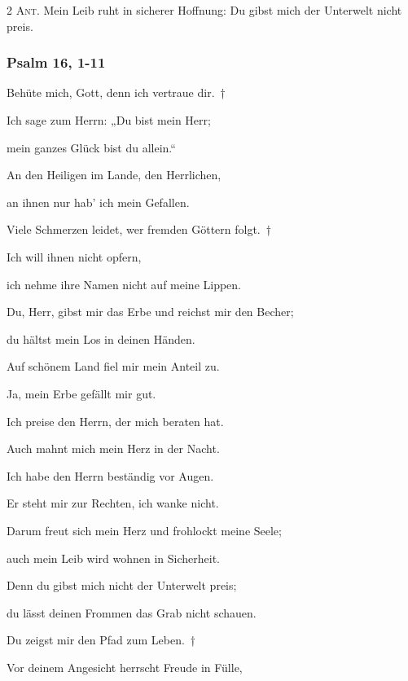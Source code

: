 \vspace{10pt}

\noindent \textsc{2 Ant.} Mein Leib ruht in sicherer Hoffnung: Du gibst mich der Unterwelt nicht preis.

\subsubsection{Psalm 16, 1-11}

\noindent Behüte mich, Gott, denn ich vertraue dir.~†~\nopagebreak

Ich sage zum Herrn: „Du bist mein Herr;~\GreStar{}~\nopagebreak

mein ganzes Glück bist du allein.“

\noindent An den Heiligen im Lande, den Herrlichen,~\GreStar{}~\nopagebreak

an ihnen nur hab’ ich mein Gefallen.

\noindent Viele Schmerzen leidet, wer fremden Göttern folgt.~†~\nopagebreak

Ich will ihnen nicht opfern,~\GreStar{}~\nopagebreak

ich nehme ihre Namen nicht auf meine Lippen.

\noindent Du, Herr, gibst mir das Erbe und reichst mir den Becher;~\GreStar{}~\nopagebreak

du hältst mein Los in deinen Händen.

\noindent Auf schönem Land fiel mir mein Anteil zu.~\GreStar{}~\nopagebreak

Ja, mein Erbe gefällt mir gut.

\noindent Ich preise den Herrn, der mich beraten hat.~\GreStar{}~\nopagebreak

Auch mahnt mich mein Herz in der Nacht.

\noindent Ich habe den Herrn beständig vor Augen.~\GreStar{}~\nopagebreak

Er steht mir zur Rechten, ich wanke nicht.

\noindent Darum freut sich mein Herz und frohlockt meine Seele;~\GreStar{}~\nopagebreak

auch mein Leib wird wohnen in Sicherheit.

\noindent Denn du gibst mich nicht der Unterwelt preis;~\GreStar{}~\nopagebreak

du lässt deinen Frommen das Grab nicht schauen.

\noindent Du zeigst mir den Pfad zum Leben.~†~\nopagebreak

Vor deinem Angesicht herrscht Freude in Fülle,~\GreStar{}~\nopagebreak

